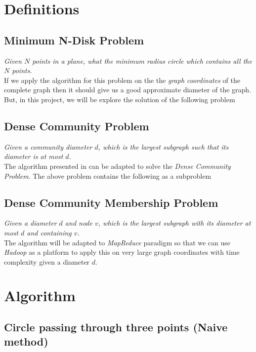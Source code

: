 \documentclass{article}
\begin{document}
    \section{Definitions}
        
        \subsection{Minimum N-Disk Problem}
            {\em Given $N$ points in a plane, what the minimum radius circle which contains all the $N$ points.} \\
        
        If we apply the algorithm for this problem on the the {\em graph coordinates} of the complete graph then it should give us a good approximate diameter of the graph. But, in this project, we will be explore the solution of the following problem
        
        \subsection{Dense Community Problem}
            {\em Given a community diameter $d$, which is the largest subgraph such that its diameter is at most $d$.} \\
        
        The algorithm presented in \cite{Efrat99} can be adapted to solve the {\em Dense Community Problem}. The above problem contains the following as a subproblem
        
        \subsection{Dense Community Membership Problem}
            {\em Given a diameter $d$ and node $v$, which is the largest subgraph with its diameter at most $d$ and containing $v$.} \\
        
        The algorithm will be adapted to {\em MapReduce} paradigm so that we can use {\em Hadoop} as a platform to apply this on very large graph coordinates with  time complexity given a diameter $d$.
    
    \section{Algorithm}
    
    \subsection{Circle passing through three points (Naive method)}
\end{document}
